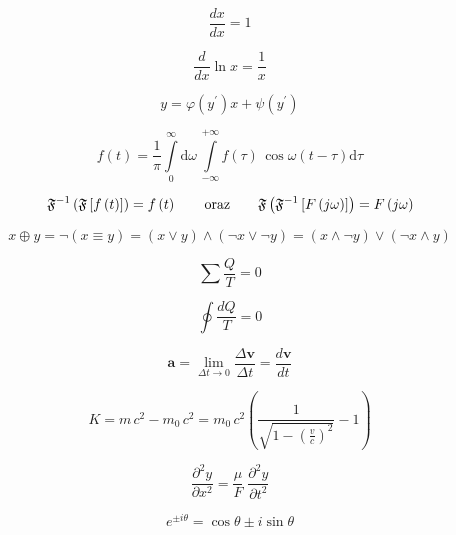 \begin{equation}
    \frac{dx}{dx} = 1
\end{equation}

\begin{equation}
    \frac{d}{dx} \ln x = \frac{1}{x}
\end{equation}

\begin{equation}
    y = \varphi  (y^\prime)x + \psi(y^\prime)
\end{equation}

\begin{equation}
    f(t) = \frac{1}{\pi} \int\limits_0^\infty \mathrm{d} \omega \,\int\limits_{-\infty}^{+\infty} f(\tau)\, \cos \omega (t-\tau)  \mathrm{d}\tau
\end{equation}

\[
\mathfrak{F}^{-1}\left(\mathfrak{F} \left[ f\left(t \right ) \right ] \right ) = f \left(t \right )
\qquad \textup{oraz} \qquad
\mathfrak{F}\left(\mathfrak{F}^{-1} \left[ F\left(j\omega \right ) \right ] \right ) = F \left(j\omega \right )
\]

\begin{equation*}
    x \oplus y = \neg (x \equiv y) = (x \vee y) \wedge (\neg x \vee \neg y) = (x \wedge \neg y) \vee (\neg x \wedge y)
\end{equation*}

\begin{equation*}
    \sum \frac{Q}{T} = 0
\end{equation*}

\begin{equation}
    \oint \frac{dQ}{T} = 0
\end{equation}

\begin{equation}
    \pmb{a} = \lim\limits_{\Delta t \to 0} \frac{\Delta \pmb{v}}{\Delta t} = \frac{d\pmb{v}}{dt}
\end{equation}

\begin{equation}
K = m\,c^2 - m_0\,c^2 
 = m_0\,c^2 \left(
  \frac{1}{ \sqrt{1 - \left( \frac{v}{c} \right)^2 } } -1 
 \right)
\end{equation}

\begin{equation}
    \frac{\partial^2 y}{\partial x^2} = \frac{\mu}{F} \; \frac{\partial^2 y}{\partial t^2}
\end{equation}

\begin{equation}
    e^{\pm i\theta} = \cos \theta \pm i \sin\theta
\end{equation}

